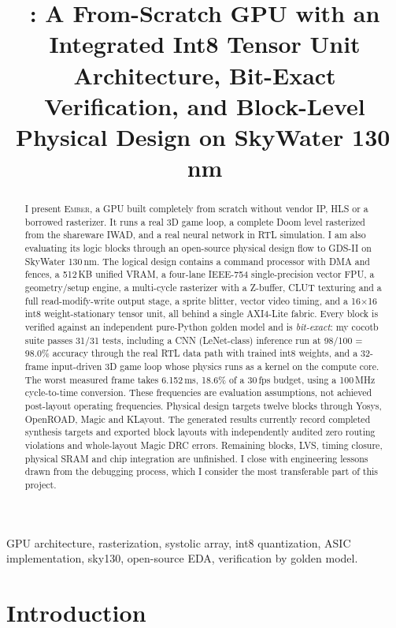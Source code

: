 \documentclass[conference]{IEEEtran}
\title{\ember{}: A From-Scratch GPU with an Integrated Int8 Tensor Unit \\
Architecture, Bit-Exact Verification, and Block-Level Physical Design on SkyWater 130\,nm}
\author{\IEEEauthorblockN{Toshal Kumbhar.}
\IEEEauthorblockA{Independent project RTL, software, and silicon flow by one person\\
\texttt{github.com/} \quad \today}
}
\newcommand{\ember}{\textsc{Ember}}
\begin{document}
\maketitle

\begin{abstract}
I present \ember{}, a GPU built completely from scratch without vendor IP,
HLS or a borrowed rasterizer. It runs a real 3D game loop, a complete Doom
level rasterized from the shareware IWAD, and a real neural network in RTL
simulation. I am also evaluating its logic blocks
through an open-source physical design flow to GDS-II on SkyWater 130\,nm.
The logical design contains a command processor with DMA and fences, a 512\,KB unified VRAM, a
four-lane IEEE-754 single-precision vector FPU, a geometry/setup engine, a
multi-cycle rasterizer with a Z-buffer, CLUT texturing and a full
read-modify-write output stage, a sprite blitter, vector video timing, and a
16$\times$16 int8 weight-stationary tensor unit, all behind a single
AXI4-Lite fabric. Every block is verified against an independent pure-Python
golden model and is \emph{bit-exact}: my cocotb suite passes
31/31 tests, including a CNN (LeNet-class) inference run at
98/100 = 98.0\% accuracy through the real RTL data path with trained int8
weights, and a 32-frame input-driven 3D game loop whose physics runs as a kernel
on the compute core. The worst measured frame takes 6.152\,ms, 18.6\% of a
30\,fps budget, using a 100\,MHz cycle-to-time conversion. These frequencies
are evaluation assumptions, not achieved post-layout operating frequencies.
Physical design targets twelve blocks through Yosys, OpenROAD, Magic and
KLayout. The generated results currently record \AsicBlocksDone{} completed
synthesis targets and \AsicBlocksGds{} exported block layouts with independently audited zero
routing violations and whole-layout Magic DRC errors. Remaining
blocks, LVS, timing closure, physical SRAM and chip integration are unfinished. I close with engineering lessons drawn from the debugging
process, which I consider the most transferable part of this project.
\end{abstract}

\begin{IEEEkeywords}
GPU architecture, rasterization, systolic array, int8 quantization, ASIC
implementation, sky130, open-source EDA, verification by golden model.
\end{IEEEkeywords}

\section{Introduction}
\end{document}
